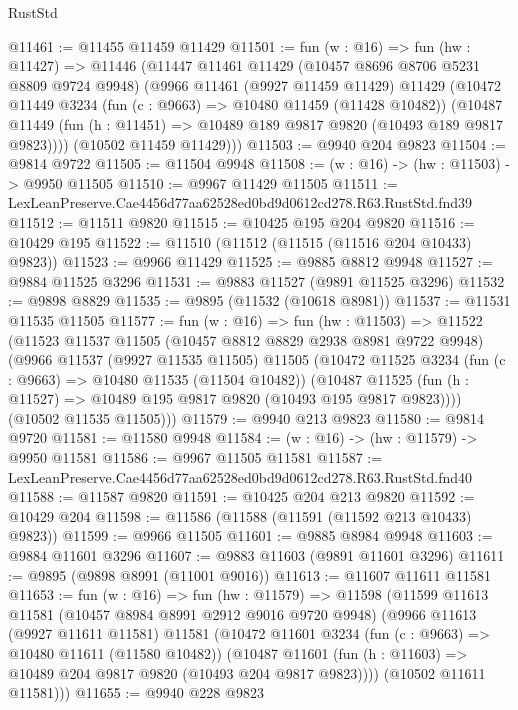 \begin{lexlean}{RustStd}
\begin{coremodule}
@11461 := @11455 @11459 @11429
@11501 := fun (w : @16) =>
  fun (hw : @11427) =>
  @11446
    (@11447
      @11461
      @11429
      (@10457 @8696 @8706 @5231 @8809 @9724 @9948)
      (@9966
        @11461
        (@9927 @11459 @11429)
        @11429
        (@10472
          @11449
          @3234
          (fun (c : @9663) => @10480 @11459 (@11428 @10482))
          (@10487 @11449 (fun (h : @11451) => @10489 @189 @9817 @9820 (@10493 @189 @9817 @9823))))
        (@10502 @11459 @11429)))
@11503 := @9940 @204 @9823
@11504 := @9814 @9722
@11505 := @11504 @9948
@11508 := (w : @16) -> (hw : @11503) -> @9950 @11505
@11510 := @9967 @11429 @11505
@11511 := LexLeanPreserve.Cae4456d77aa62528ed0bd9d0612cd278.R63.RustStd.fnd39
@11512 := @11511 @9820
@11515 := @10425 @195 @204 @9820
@11516 := @10429 @195
@11522 := @11510 (@11512 (@11515 (@11516 @204 @10433) @9823))
@11523 := @9966 @11429
@11525 := @9885 @8812 @9948
@11527 := @9884 @11525 @3296
@11531 := @9883 @11527 (@9891 @11525 @3296)
@11532 := @9898 @8829
@11535 := @9895 (@11532 (@10618 @8981))
@11537 := @11531 @11535 @11505
@11577 := fun (w : @16) =>
  fun (hw : @11503) =>
  @11522
    (@11523
      @11537
      @11505
      (@10457 @8812 @8829 @2938 @8981 @9722 @9948)
      (@9966
        @11537
        (@9927 @11535 @11505)
        @11505
        (@10472
          @11525
          @3234
          (fun (c : @9663) => @10480 @11535 (@11504 @10482))
          (@10487 @11525 (fun (h : @11527) => @10489 @195 @9817 @9820 (@10493 @195 @9817 @9823))))
        (@10502 @11535 @11505)))
@11579 := @9940 @213 @9823
@11580 := @9814 @9720
@11581 := @11580 @9948
@11584 := (w : @16) -> (hw : @11579) -> @9950 @11581
@11586 := @9967 @11505 @11581
@11587 := LexLeanPreserve.Cae4456d77aa62528ed0bd9d0612cd278.R63.RustStd.fnd40
@11588 := @11587 @9820
@11591 := @10425 @204 @213 @9820
@11592 := @10429 @204
@11598 := @11586 (@11588 (@11591 (@11592 @213 @10433) @9823))
@11599 := @9966 @11505
@11601 := @9885 @8984 @9948
@11603 := @9884 @11601 @3296
@11607 := @9883 @11603 (@9891 @11601 @3296)
@11611 := @9895 (@9898 @8991 (@11001 @9016))
@11613 := @11607 @11611 @11581
@11653 := fun (w : @16) =>
  fun (hw : @11579) =>
  @11598
    (@11599
      @11613
      @11581
      (@10457 @8984 @8991 @2912 @9016 @9720 @9948)
      (@9966
        @11613
        (@9927 @11611 @11581)
        @11581
        (@10472
          @11601
          @3234
          (fun (c : @9663) => @10480 @11611 (@11580 @10482))
          (@10487 @11601 (fun (h : @11603) => @10489 @204 @9817 @9820 (@10493 @204 @9817 @9823))))
        (@10502 @11611 @11581)))
@11655 := @9940 @228 @9823

\end{coremodule}
\end{lexlean}
